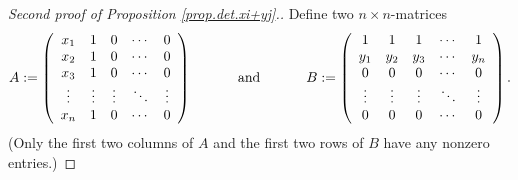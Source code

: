 \begin{proof}
[Second proof of Proposition \ref{prop.det.xi+yj}.]Define two $n\times
n$-matrices%
\[
A:=\left(
\begin{array}
[c]{ccccc}%
x_{1} & 1 & 0 & \cdots & 0\\
x_{2} & 1 & 0 & \cdots & 0\\
x_{3} & 1 & 0 & \cdots & 0\\
\vdots & \vdots & \vdots & \ddots & \vdots\\
x_{n} & 1 & 0 & \cdots & 0
\end{array}
\right)  \ \ \ \ \ \ \ \ \ \ \text{and}\ \ \ \ \ \ \ \ \ \ B:=\left(
\begin{array}
[c]{ccccc}%
1 & 1 & 1 & \cdots & 1\\
y_{1} & y_{2} & y_{3} & \cdots & y_{n}\\
0 & 0 & 0 & \cdots & 0\\
\vdots & \vdots & \vdots & \ddots & \vdots\\
0 & 0 & 0 & \cdots & 0
\end{array}
\right)  .
\]
(Only the first two columns of $A$ and the first two rows of $B$ have any
nonzero entries.)


\end{proof}
